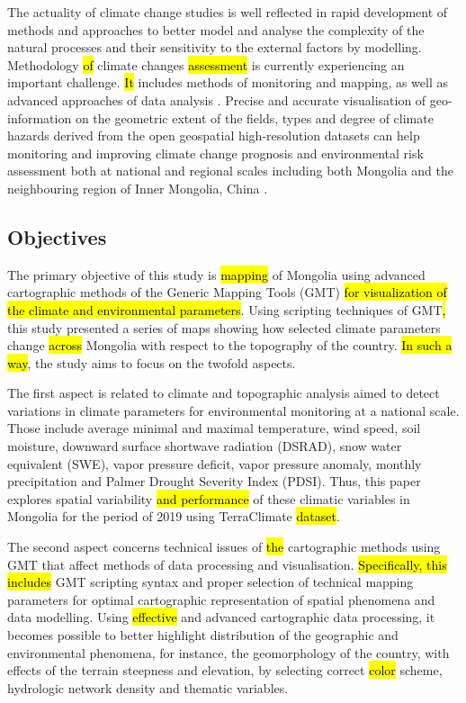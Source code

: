 \documentclass[geosciences,article,submit,pdftex,moreauthors]{Definitions/mdpi}
\begin{document}
The actuality of climate change studies is well reflected in rapid development of methods and approaches to better model and analyse the complexity of the natural processes and their sensitivity to the external factors by modelling. Methodology \hl{of} climate changes \hl{assessment} is currently experiencing an important challenge. \hl{It} includes methods of monitoring and mapping, as well as advanced approaches of data analysis \cite{FENG2020102861,WANG201768,GUO2021141481}. Precise and accurate visualisation of geo-information on the geometric extent of the fields, types and degree of climate hazards derived from the open geospatial high-resolution datasets can help monitoring and improving climate change prognosis and environmental risk assessment both at national and regional scales including both Mongolia and the neighbouring region of Inner Mongolia, China \cite{JIE2021353,5631071,5964785}. 

\subsection{Objectives}
The primary objective of this study is \hl{mapping} of Mongolia using advanced cartographic methods of the Generic Mapping Tools (GMT) \hl{for visualization of the climate and environmental parameters}. Using scripting techniques of GMT\hl{,} this study presented a series of maps showing how selected climate parameters change \hl{across} Mongolia with respect to the topography of the country. \hl{In such a way}, the study aims to focus on the twofold aspects.

The first aspect is related to climate and topographic analysis aimed to detect variations in climate parameters for environmental monitoring at a national scale. Those include average minimal and maximal temperature, wind speed, soil moisture, downward surface shortwave radiation (DSRAD), snow water equivalent (SWE), vapor pressure deficit, vapor pressure anomaly, monthly precipitation and Palmer Drought Severity Index (PDSI). Thus, this paper explores spatial variability \hl{and performance} of these climatic variables in Mongolia for the period of 2019 using TerraClimate \hl{dataset}.

The second aspect concerns technical issues of \hl{the} cartographic methods using GMT that affect methods of data processing and visualisation. \hl{Specifically, this includes} GMT scripting syntax and proper selection of technical mapping parameters for optimal cartographic representation of spatial phenomena and data modelling. Using \hl{effective} and advanced cartographic data processing, it becomes possible to better highlight distribution of the geographic and environmental phenomena, for instance, the geomorphology of the country, with effects of the terrain steepness and elevation, by selecting correct \hl{color} scheme, hydrologic network density and thematic variables.
\end{document}
